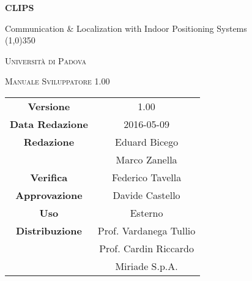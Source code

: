 \documentclass[a4paper,12pt]{article}
\author{Eduard Bicego}
\date{08/05/2016}
\begin{document}
\begin{titlepage}
	\centering
	{\huge\bfseries CLIPS\par}
	Communication \& Localization with Indoor Positioning Systems \\
	\line(1,0){350} \\
	{\scshape\LARGE Università di Padova \par}
	\vspace{1cm}
	{\scshape\Large Manuale Sviluppatore 1.00 \par}
	\logo
	\newpage
	\begin{tabular}{c|c}
		{\hfill \textbf{Versione}} 			& 1.00						\\
		{\hfill\textbf{Data Redazione}} 	& 2016-05-09  				\\
		{\hfill\textbf{Redazione}} 			& Eduard Bicego				\\
											& Marco Zanella				\\
		{\hfill\textbf{Verifica}} 			& Federico Tavella			\\
		{\hfill\textbf{Approvazione}} 		& Davide Castello			\\
		{\hfill\textbf{Uso}} 				& Esterno					\\
		{\hfill\textbf{Distribuzione}} 		& Prof. Vardanega Tullio	\\
											& Prof. Cardin Riccardo 	\\
											& Miriade S.p.A. 			\\
	\end{tabular}
\end{titlepage}
	
	\newpage
	\pagestyle{myfront}
	
		\newpage
			
		\newpage
			\tableofcontents
		\newpage
			\listoffigures
	\label{LastFrontPage}

	\newpage
		\pagestyle{mymain}
	\newpage
		
	\newpage
		
	\newpage
		
	\newpage
		
	\newpage
		
	\newpage
		
	\newpage
		
		
	\newpage
		


		
	\label{LastPage}
\end{document}

